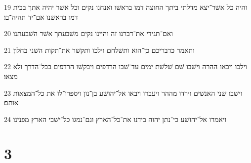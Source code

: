\par 19 והיה כל אשׁר־יצא מדלתי ביתך החוצה דמו בראשׁו ואנחנו נקים וכל אשׁר יהיה אתך בבית דמו בראשׁנו אם־יד תהיה־בו׃
\par 20 ואם־תגידי את־דברנו זה והיינו נקים משׁבעתך אשׁר השׁבעתנו׃
\par 21 ותאמר כדבריכם כן־הוא ותשׁלחם וילכו ותקשׁר את־תקות השׁני בחלון׃
\par 22 וילכו ויבאו ההרה וישׁבו שׁם שׁלשׁת ימים עד־שׁבו הרדפים ויבקשׁו הרדפים בכל־הדרך ולא מצאו׃
\par 23 וישׁבו שׁני האנשׁים וירדו מההר ויעברו ויבאו אל־יהושׁע בן־נון ויספרו־לו את כל־המצאות אותם׃
\par 24 ויאמרו אל־יהושׁע כי־נתן יהוה בידנו את־כל־הארץ וגם־נמגו כל־ישׁבי הארץ מפנינו׃

\chapter{3}

